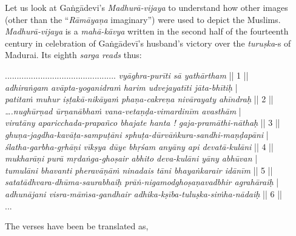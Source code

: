 Let us look at Gaṅgādevi’s {\sl Madhurā-vijaya} to understand how other images (other than the “{\sl Rāmāyaṇa} imaginary”) were used to depict the Muslims. {\sl Madhurā-vijaya} is a {\sl mahā-kāvya} written in the second half of the fourteenth century in celebration of Gaṅgādevī’s husband’s victory over the {\sl turuṣka}-s of Madurai. Its eighth {\sl sarga reads} thus: 

\begin{myquote} 
............................................... {{\sl vyāghra-purīti sā yathārtham}} || 1 ||\\
{\sl adhiraṅgam avāpta-yoganidraṁ harim udvejayatīti jāta-bhītiḥ} |\\
{\sl patitaṁ muhur iṣṭakā-nikāyaṁ phaṇa-cakreṇa nivārayaty ahīndraḥ} || 2 ||\\
{\sl ….nughūrṇad ūrṇanābhaṁ vana-vetaṇḍa-vimardinīm avasthām} |\\
{\sl viratāny aparicchada-prapañco bhajate hanta ! gaja-pramāthi-nāthaḥ} || 3 ||\\ 
{\sl ghuṇa-jagdha-kavāṭa-sampuṭāni sphuṭa-dūrvāṅkura-sandhi-maṇḍapāni} |\\
{\sl ślatha-garbha-gṛhāṇi vīkṣya dūye bhṛśam anyāny api devatā-kulāni} || 4 ||\\
{\sl mukharāṇi purā mṛdaṅga-ghoṣair abhito deva-kulāni yāny abhūvan} |\\
{\sl tumulāni bhavanti pheravāṇāṁ ninadais tāni bhayaṅkarair idānīm} || 5 ||\\
{\sl satatādhvara-dhūma-saurabhaiḥ prāṅ-nigamodghoṣaṇavadbhir agrahāraiḥ} |\\
{\sl adhunājani visra-māṁsa-gandhair adhika-kṣība-tuluṣka-siṁha-nādaiḥ} || 6 ||\\
\hspace{5cm} ...\qquad
\end{myquote}

The verses have been be translated as, 

